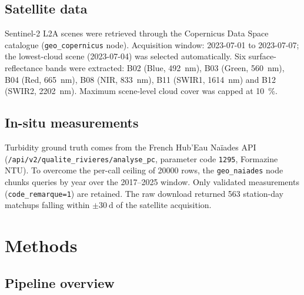 \documentclass[11pt,a4paper]{article}
\begin{document}
\subsection{Satellite data}
Sentinel-2 L2A scenes were retrieved through the Copernicus Data Space catalogue (\texttt{geo\_copernicus} node). Acquisition window: 2023-07-01 to 2023-07-07; the lowest-cloud scene (2023-07-04) was selected automatically. Six surface-reflectance bands were extracted: B02 (Blue, \SI{492}{\nano\metre}), B03 (Green, \SI{560}{\nano\metre}), B04 (Red, \SI{665}{\nano\metre}), B08 (NIR, \SI{833}{\nano\metre}), B11 (SWIR1, \SI{1614}{\nano\metre}) and B12 (SWIR2, \SI{2202}{\nano\metre}). Maximum scene-level cloud cover was capped at \SI{10}{\percent}.

\subsection{In-situ measurements}
Turbidity ground truth comes from the French Hub'Eau Naïades API (\texttt{/api/v2/qualite\_rivieres/analyse\_pc}, parameter code \texttt{1295}, Formazine NTU). To overcome the per-call ceiling of \num{20000} rows, the \texttt{geo\_naiades} node chunks queries by year over the 2017--2025 window. Only validated measurements (\texttt{code\_remarque=1}) are retained. The raw download returned 563 station-day matchups falling within $\pm\SI{30}{\day}$ of the satellite acquisition.

\section{Methods}
\label{sec:methods}

\subsection{Pipeline overview}
\end{document}

